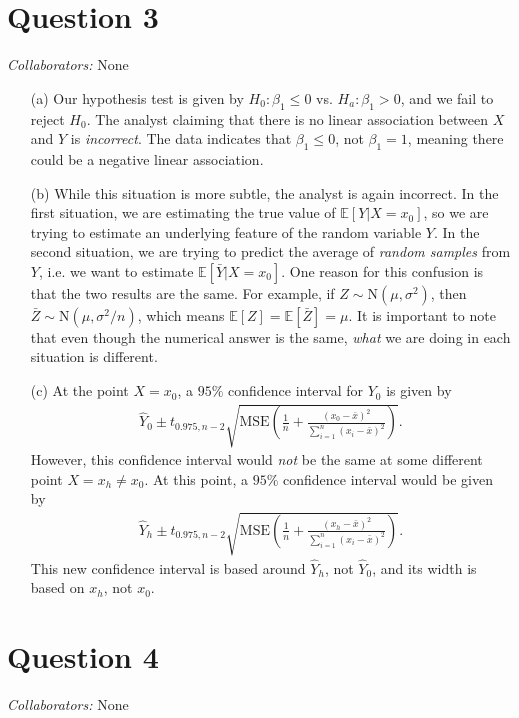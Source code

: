 \documentclass[10pt]{article}
\newcommand{\mycolab}[1]{\textcolor{colabcol}{\textsl{Collaborators:}} #1\\}
\newcommand{\mycolaba}[1]{\textcolor{colabcol}{\textsl{Collaborators:}} #1}
\begin{document}
\section{Question 3} \noindent
\mycolaba{None}
\begin{itemize}
    \item[(a)] Our hypothesis test is given by \(H_0:\beta_1 \le 0\) vs. \(H_a:\beta_1 > 0\), and we fail to reject \(H_0\). The analyst claiming that 
    there is no linear association between \(X\) and \(Y\) is \textsl{incorrect}. The data indicates that \(\beta_1 \le 0\), not \(\beta_1 = 1\), meaning
    there could be a negative linear association. 
    \item[(b)] While this situation is more subtle, the analyst is again incorrect. In the first situation, we are estimating the true value of 
    \(\mathbb{E}[Y|X=x_0]\), so we are trying to estimate an underlying feature of the random variable \(Y\). In the second situation, we are trying 
    to predict the average of \textsl{random samples} from \(Y\), i.e. we want to estimate \(\mathbb{E}[\bar{Y}|X=x_0]\). One reason for this confusion is that
    the two results are the same. For example, if \(Z \sim \mathrm{N}(\mu, \sigma^2)\), then \(\bar{Z}\sim\mathrm{N}(\mu,\sigma^2/n)\), which means 
    \(\mathbb{E}[Z] = \mathbb{E}[\bar{Z}] = \mu\). It is important to note that even though the numerical answer is the same, \textsl{what} we are doing in
    each situation is different.
    \item[(c)] At the point \(X = x_0\), a \(95\%{}\) confidence interval for \(Y_0\) is given by 
    \begin{align*}
        \hat{Y}_0 \pm t_{0.975,n-2} \sqrt{\mathrm{MSE} \left( \frac{1}{n} + \frac{(x_0 - \bar{x})^2}{\sum_{i=1}^n(x_i - \bar{x})^2} \right)}.
    \end{align*}
    However, this confidence interval would \textsl{not} be the same at some different point \(X = x_h \neq x_0\). At this point, a \(95\%{}\)
    confidence interval would be given by 
    \begin{align*}
        \hat{Y}_h \pm t_{0.975,n-2} \sqrt{\mathrm{MSE} \left( \frac{1}{n} + \frac{(x_h - \bar{x})^2}{\sum_{i=1}^n(x_i - \bar{x})^2} \right)}.
    \end{align*}
    This new confidence interval is based around \(\hat{Y}_h\), not \(\hat{Y}_0\), and its width is based on \(x_h\), not \(x_0\).
\end{itemize}

\section{Question 4} \noindent
\mycolab{None}
\end{document}
